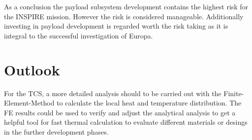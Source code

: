 As a conclusion the payload subsystem development contains the highest risk for the INSPIRE mission. However the risk is considered manageable. Additionally investing in payload development is regarded worth the risk taking as it is integral to the successful investigation of Europa.

\section{Outlook}
\label{sec:Outlook}



For the TCS, a more detailed analysis should to be carried out with the Finite-Element-Method to calculate the local heat and temperature distribution.
The FE results could be used to verify and adjust the analytical analysis to get a helpful tool for fast thermal calculation to evaluate different materials or desings in the further development phases.
